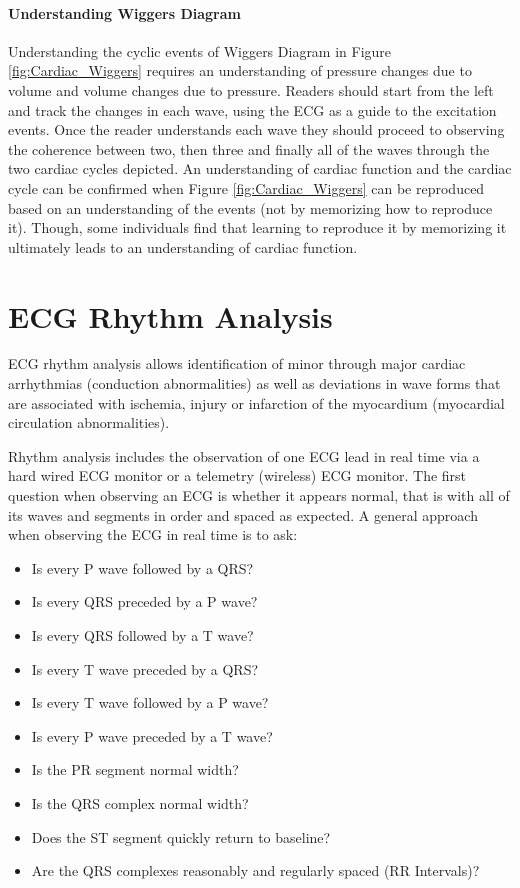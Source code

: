 \paragraph{Understanding Wiggers Diagram}

Understanding the cyclic events of Wiggers Diagram in Figure \ref{fig:Cardiac_Wiggers} requires an understanding of pressure changes due to volume and volume changes due to pressure. Readers should start from the left and track the changes in each wave, using the ECG as a guide to the excitation events. Once the reader understands each wave they should proceed to observing the coherence between two, then three and finally all of the waves through the two cardiac cycles depicted. An understanding of cardiac function and the cardiac cycle can be confirmed when Figure \ref{fig:Cardiac_Wiggers} can be reproduced based on an understanding of the events (not by memorizing how to reproduce it). Though, some individuals find that learning to reproduce it by memorizing it ultimately leads to an understanding of cardiac function.


\section{ECG Rhythm Analysis}

ECG rhythm analysis allows identification of minor through major cardiac arrhythmias (conduction abnormalities) as well as deviations in wave forms that are associated with ischemia, injury or infarction of the myocardium (myocardial circulation abnormalities). 

Rhythm analysis includes the observation of one ECG lead in real time via a hard wired ECG monitor or a telemetry (wireless) ECG monitor. The first question when observing an ECG is whether it appears normal, that is with all of its waves and segments in order and spaced as expected. A general approach when observing the ECG in real time is to ask:

\begin{itemize}
    \item Is every P wave followed by a QRS?
    \item Is every QRS preceded by a P wave?
    \item Is every QRS followed by a T wave?
    \item Is every T wave preceded by a QRS?
    \item Is every T wave followed by a P wave?
    \item Is every P wave preceded by a T wave?
    \item Is the PR segment normal width?
    \item Is the QRS complex normal width?
    \item Does the ST segment quickly return to baseline?
    \item Are the QRS complexes reasonably and regularly spaced (RR Intervals)?
\end{itemize}


